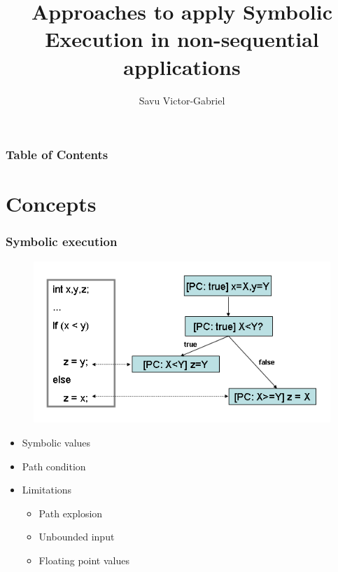 \documentclass{beamer}
\title{Approaches to apply Symbolic Execution in non-sequential applications}
\author{Savu Victor-Gabriel}
\institute{Technische Universität München, \email{victorsavu3@gmail.com}}
\begin{document}
	\frame{\titlepage}
	
	\begin{frame}
		\frametitle{Table of Contents}
		\tableofcontents
	\end{frame}
	
	\section{Concepts}
	
	\begin{frame}
		\frametitle{Symbolic execution}
		
		\begin{figure}[htbp]
			\centering
			\includegraphics[scale=0.3]{symbolic}
		\end{figure}
		
		\begin{itemize}
			\item Symbolic values
			\item Path condition
			\item Limitations
			\begin{itemize}
				\item Path explosion
				\item Unbounded input
				\item Floating point values
			\end{itemize}
		\end{itemize}
	\end{frame}
	
\end{document}
